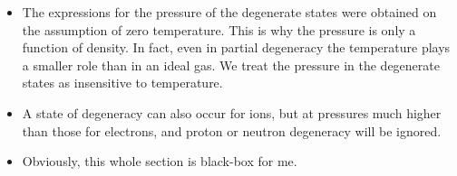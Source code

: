 \documentclass[10pt,amsmath,amssymb,aps,pra]{revtex4-2}
\begin{document}
\begin{itemize}
\item The expressions for the pressure of the degenerate states were obtained on
the assumption of zero temperature. This is why the pressure is only a function
of density. In fact, even in partial degeneracy the temperature plays a smaller
role than in an ideal gas. We treat the pressure in the degenerate states as
insensitive to temperature.

\item A state of degeneracy can also occur for ions, but at pressures much
higher than those for electrons, and proton or neutron degeneracy will be
ignored.

\item Obviously, this whole section is black-box for me.
\end{itemize}
\end{document}
